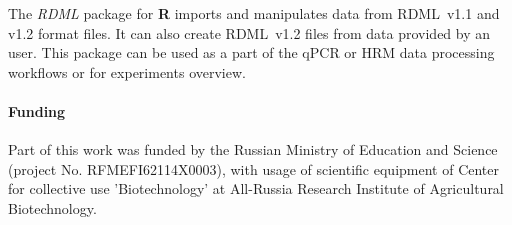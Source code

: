 \documentclass{bioinfo}
\begin{document}
	The \textit{RDML} package for \textbf{R} imports and manipulates data from RDML~v1.1 and 
	v1.2 format files. It can also create RDML~v1.2 files from data provided by an user. 
	This package can be used as a part of the qPCR or HRM data processing workflows or 
	for experiments overview.
	
	\paragraph{Funding\textcolon}  Part of this work was funded by the Russian
	Ministry of Education and Science (project No. RFMEFI62114X0003), with usage of
	scientific equipment of Center for collective use ’Biotechnology’ at All-Russia
	Research Institute of Agricultural Biotechnology.
	
	
	
\end{document}
